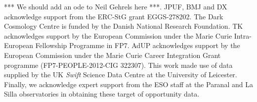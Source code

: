 \documentclass{aa}    %
\begin{document}
\begin{acknowledgements}
	*** We should add an ode to Neil Gehrels here ***.
	JPUF, BMJ and DX acknowledge support from the ERC-StG grant EGGS-278202.  The
	Dark Cosmology Centre is funded by the Danish National Research Foundation.  TK
	acknowledges support by the European Commission under the Marie Curie
	Intra-European Fellowship Programme in FP7.  AdUP acknowledges support by the
	European Commission under the Marie Curie Career Integration Grant programme
	(FP7-PEOPLE-2012-CIG 322307).  This work made use of data supplied by the UK
	{\it Swift} Science Data Centre at the University of Leicester.  Finally, we
	acknowledge expert support from the ESO staff at the Paranal and La Silla
	observatories in obtaining these target of opportunity data.
	
\end{acknowledgements}






\clearpage
\end{document}
